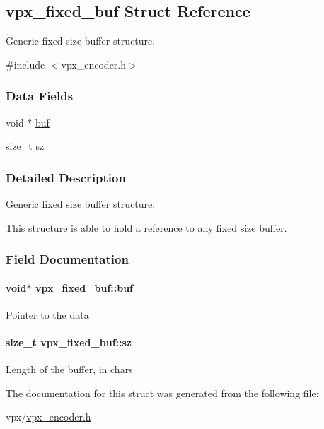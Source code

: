 \hypertarget{structvpx__fixed__buf}{\subsection{vpx\-\_\-fixed\-\_\-buf \-Struct \-Reference}
\label{structvpx__fixed__buf}
}


\-Generic fixed size buffer structure.  




{\ttfamily \#include $<$vpx\-\_\-encoder.\-h$>$}

\subsubsection*{\-Data \-Fields}
\begin{DoxyCompactItemize}
\item 
void $\ast$ \hyperlink{structvpx__fixed__buf_ac93e43ae3fcc1023dca86d37016ae3f0}{buf}
\item 
size\-\_\-t \hyperlink{structvpx__fixed__buf_a43d7f8247ed9752f65f0a7639817ae84}{sz}
\end{DoxyCompactItemize}


\subsubsection{\-Detailed \-Description}
\-Generic fixed size buffer structure. 

\-This structure is able to hold a reference to any fixed size buffer. 

\subsubsection{\-Field \-Documentation}
\hypertarget{structvpx__fixed__buf_ac93e43ae3fcc1023dca86d37016ae3f0}{
\paragraph[{buf}]{\setlength{\rightskip}{0pt plus 5cm}void$\ast$ {\bf vpx\-\_\-fixed\-\_\-buf\-::buf}}}\label{structvpx__fixed__buf_ac93e43ae3fcc1023dca86d37016ae3f0}
\-Pointer to the data \hypertarget{structvpx__fixed__buf_a43d7f8247ed9752f65f0a7639817ae84}{
\paragraph[{sz}]{\setlength{\rightskip}{0pt plus 5cm}size\-\_\-t {\bf vpx\-\_\-fixed\-\_\-buf\-::sz}}}\label{structvpx__fixed__buf_a43d7f8247ed9752f65f0a7639817ae84}
\-Length of the buffer, in chars 

\-The documentation for this struct was generated from the following file\-:\begin{DoxyCompactItemize}
\item 
vpx/\hyperlink{vpx__encoder_8h}{vpx\-\_\-encoder.\-h}\end{DoxyCompactItemize}
